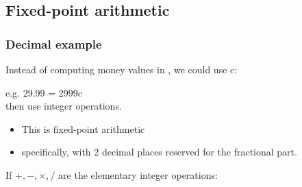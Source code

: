 \documentclass[12pt]{article}
\begin{document}
\subsection{Fixed-point arithmetic}

\subsubsection{Decimal example}

Instead of computing money values in \texteuro, we could use c:

e.g.  29.99\texteuro{} = 2999c\\
then use integer operations.

\begin{itemize}
  \item This is fixed-point arithmetic
  \item specifically, with 2 decimal places reserved for the fractional part.
\end{itemize}




If $+, -, \times, /$ are the elementary integer operations:
\end{document}
